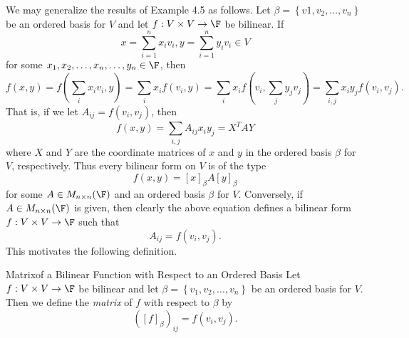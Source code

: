 \documentclass[linearalgebraII]{subfiles}
\begin{document}
    \begin{remark}
        We may generalize the results of Example 4.5 as follows. Let $\beta = \left\lbrace v1,v_2,\ldots,v_n \right\rbrace $ be an ordered basis for $V$ and let $f:V\times V\to\F$ be bilinear. If
        \begin{equation*}
            x = \sum^{n}_{i=1} x_iv_i, y = \sum^{n}_{i=1} y_iv_i\in V
        \end{equation*}
        for some $x_1,x_2,\ldots,x_n, \ldots, y_n\in\F$, then
        \begin{equation*}
            f(x,y) = f\left( \sum^{}_{i} x_iv_i,y \right) = \sum^{}_{i} x_if\left( v_i,y \right) = \sum^{}_{i} x_if\left( v_i, \sum^{}_{j} y_jv_j \right) = \sum^{}_{i,j} x_iy_jf\left( v_i,v_j \right) . 
        \end{equation*}
        That is, if we let $A_{ij} = f\left( v_i,v_j \right)$, then
        \begin{equation*}
            f\left( x,y \right) = \sum^{}_{i,j} A_{ij}x_iy_j = X^TAY
        \end{equation*}
        where $X$ and $Y$ are the coordinate matrices of $x$ and $y$ in the ordered basis $\beta$ for $V$, respectively. Thus every bilinear form on $V$ is of the type
        \begin{equation*}
            f\left( x,y \right) = \left[ x \right] _\beta A\left[ y \right] _\beta
        \end{equation*}
        for some $A\in M_{n\times n}(\F)$ and an ordered basis $\beta$ for $V$. Conversely, if $A\in M_{n\times n}(\F)$ is given, then clearly the above equation defines a bilinear form $f:V\times V\to\F$ such that
        \begin{equation*}
            A_{ij} = f\left( v_i,v_j \right) .
        \end{equation*}
        This motivates the following definition.
    \end{remark}

    \begin{definition}{Matrix}{of a Bilinear Function with Respect to an Ordered Basis}
        Let $f:V\times V\to\F$ be bilinear and let $\beta = \left\lbrace v_1,v_2,\ldots,v_n \right\rbrace$ be an ordered basis for $V$. Then we define the \emph{matrix} of $f$ with respect to $\beta$ by
        \begin{equation*}
            \left( \left[ f \right] _\beta \right) _{ij} = f\left( v_i,v_j \right) .
        \end{equation*}
    \end{definition}
    
\end{document}
